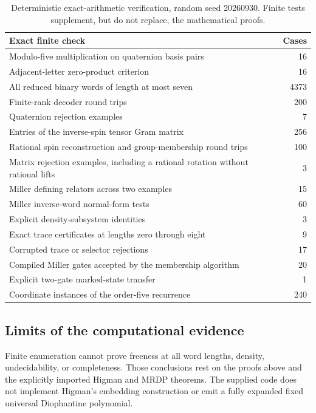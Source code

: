 \documentclass[11pt,letterpaper]{article}
\numberwithin{equation}{section}
\theoremstyle{definition}
\theoremstyle{remark}
\begin{document}
\begin{table}[htbp]
\centering
\small
\begin{tabularx}{\textwidth}{@{}Xr@{}}
\toprule
Exact finite check & Cases\\
\midrule
Modulo-five multiplication on quaternion basis pairs & 16\\
Adjacent-letter zero-product criterion & 16\\
All reduced binary words of length at most seven & 4373\\
Finite-rank decoder round trips & 200\\
Quaternion rejection examples & 7\\
Entries of the inverse-spin tensor Gram matrix & 256\\
Rational spin reconstruction and group-membership round trips & 100\\
Matrix rejection examples, including a rational rotation without rational lifts & 3\\
Miller defining relators across two examples & 15\\
Miller inverse-word normal-form tests & 60\\
Explicit density-subsystem identities & 3\\
Exact trace certificates at lengths zero through eight & 9\\
Corrupted trace or selector rejections & 17\\
Compiled Miller gates accepted by the membership algorithm & 20\\
Explicit two-gate marked-state transfer & 1\\
Coordinate instances of the order-five recurrence & 240\\
\bottomrule
\end{tabularx}
\caption{Deterministic exact-arithmetic verification, random seed 20260930.
Finite tests supplement, but do not replace, the mathematical proofs.}
\label{pqc:rr:tab:checks}
\end{table}

\subsection{Limits of the computational evidence}

Finite enumeration cannot prove freeness at all word lengths, density,
undecidability, or completeness. Those conclusions rest on the proofs
above and the explicitly imported Higman and MRDP theorems. The supplied
code does not implement Higman's embedding construction or emit a fully
expanded fixed universal Diophantine polynomial.
\end{document}
